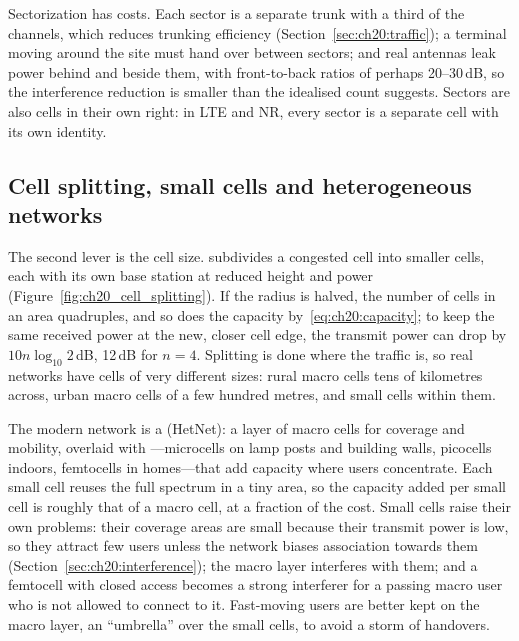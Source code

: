Sectorization has costs. Each sector is a separate trunk with a third of the channels, which reduces trunking
efficiency (Section~\ref{sec:ch20:traffic}); a terminal moving around the site must hand over between sectors;
and real antennas leak power behind and beside them, with front-to-back ratios of perhaps 20--30\,dB, so the
interference reduction is smaller than the idealised count suggests. Sectors are also cells in their own right:
in LTE and NR, every sector is a separate cell with its own identity.

\subsection{Cell splitting, small cells and heterogeneous networks}

The second lever is the cell size.  subdivides a congested cell into smaller cells, each with
its own base station at reduced height and power (Figure~\ref{fig:ch20_cell_splitting}). If the radius is halved,
the number of cells in an area quadruples, and so does the capacity by~\eqref{eq:ch20:capacity}; to keep the same
received power at the new, closer cell edge, the transmit power can drop by $10n\log_{10}2$\,dB, 12\,dB for $n=4$.
Splitting is done where the traffic is, so real networks have cells of very different sizes: rural macro cells
tens of kilometres across, urban macro cells of a few hundred metres, and small cells within them.

The modern network is a  (HetNet): a layer of macro cells for coverage and mobility,
overlaid with ---microcells on lamp posts and building walls, picocells indoors, femtocells in
homes---that add capacity where users concentrate. Each small cell reuses the full spectrum in a tiny area, so the
capacity added per small cell is roughly that of a macro cell, at a fraction of the cost. Small cells raise their
own problems: their coverage areas are small because their transmit power is low, so they attract few users unless
the network biases association towards them (Section~\ref{sec:ch20:interference}); the macro layer interferes with
them; and a femtocell with closed access becomes a strong interferer for a passing macro user who is not allowed
to connect to it. Fast-moving users are better kept on the macro layer, an ``umbrella'' over the small cells, to
avoid a storm of handovers.


